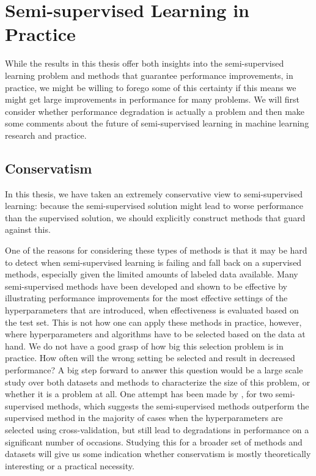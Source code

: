 \documentclass[twoside]{memoir}\usepackage[]{graphicx}\usepackage{xcolor}
\begin{document}
\section{Semi-supervised Learning in Practice}
While the results in this thesis offer both insights into the semi-supervised learning problem and methods that guarantee performance improvements, in practice, we might be willing to forego some of this certainty if this means we might get large improvements in performance for many problems. We will first consider whether performance degradation is actually a problem and then make some comments about the future of semi-supervised learning in machine learning research and practice. 

\subsection{Conservatism}
In this thesis, we have taken an extremely conservative view to semi-supervised learning: because the semi-supervised solution might lead to worse performance than the supervised solution, we should explicitly construct methods that guard against this.

One of the reasons for considering these types of methods is that it may be hard to detect when semi-supervised learning is failing and fall back on a supervised methods, especially given the limited amounts of labeled data available. Many semi-supervised methods have been developed and shown to be effective by illustrating performance improvements for the most effective settings of the hyperparameters that are introduced, when effectiveness is evaluated based on the test set. This is not how one can apply these methods in practice, however, where hyperparameters and algorithms have to be selected based on the data at hand. We do not have a good grasp of how big this selection problem is in practice. How often will the wrong setting be selected and result in decreased performance? A big step forward to answer this question would be a large scale study over both datasets and methods to characterize the size of this problem, or whether it is a problem at all. One attempt has been made by \citet{Goldberg2009}, for two semi-supervised methods, which suggests the semi-supervised methods outperform the supervised method in the majority of cases when the hyperparameters are selected using cross-validation, but still lead to degradations in performance on a significant number of occasions. Studying this for a broader set of methods and datasets will give us some indication whether conservatism is mostly theoretically interesting or a practical necessity.
\end{document}
